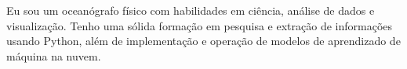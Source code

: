 \documentclass[9pt]{developercv} %
\begin{document}

\begin{minipage}[t]{1\textwidth} %
Eu sou um oceanógrafo físico com habilidades em ciência, análise de dados e visualização. Tenho uma sólida formação em pesquisa e extração de informações usando Python, além de implementação e operação de modelos de aprendizado de máquina na nuvem. 
\end{minipage}
\hspace{0.3cm}
\hfill %

\begin{center}
\end{center}

\vspace{-0.2cm}
\end{document}
